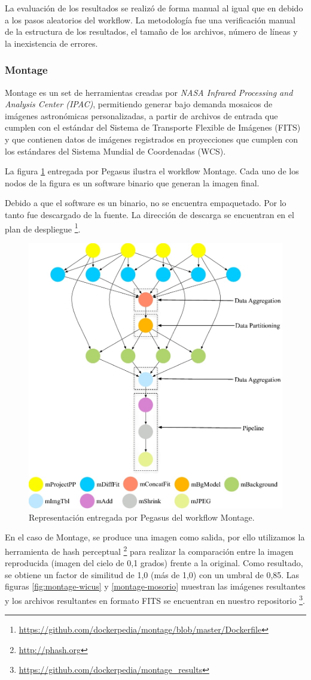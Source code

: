 La evaluación de los resultados se realizó de forma manual al igual que en \cite{santana2017reproducibility} debido a los pasos aleatorios del workflow. La metodología fue una verificación manual de la estructura de los resultados, el tamaño de los archivos, número de líneas y la inexistencia de errores.

\subsubsection{Montage}

Montage es un set de herramientas creadas por \textit{NASA Infrared Processing and Analysis Center (IPAC)}, permitiendo generar bajo demanda mosaicos de imágenes astronómicas personalizadas, a partir de archivos de entrada que cumplen con el estándar del Sistema de Transporte Flexible de Imágenes (FITS) y que contienen datos de imágenes registrados en proyecciones que cumplen con los estándares del Sistema Mundial de Coordenadas (WCS).

La figura \ref{fig:montage} entregada por Pegasus ilustra el workflow Montage. Cada uno de los nodos de la figura es un software binario que generan la imagen final.

Debido a que el software es un binario, no se encuentra empaquetado. Por lo tanto fue descargado de la fuente. La dirección de descarga se encuentran en el plan de despliegue \footnote{\url{https://github.com/dockerpedia/montage/blob/master/Dockerfile}}. 

\begin{figure}[t]
\centering
\includegraphics[width=.5\textwidth]{Figures/montage}
\caption{Representación entregada por Pegasus del workflow Montage.}\label{fig:montage}
\end{figure}

En el caso de Montage, se produce una imagen como salida, por ello utilizamos la herramienta de hash perceptual \footnote{\url{http://phash.org}} para realizar la comparación entre la imagen reproducida (imagen del cielo de 0,1 grados) frente a la original.
Como resultado, se obtiene un factor de similitud de 1,0 (más de 1,0) con un umbral de 0,85.
Las figuras \ref{fig:montage-wicus} y \ref{montage-mosorio} muestran las imágenes resultantes y los archivos resultantes en formato FITS se encuentran en nuestro repositorio \footnote{\url{https://github.com/dockerpedia/montage_results}}. 

